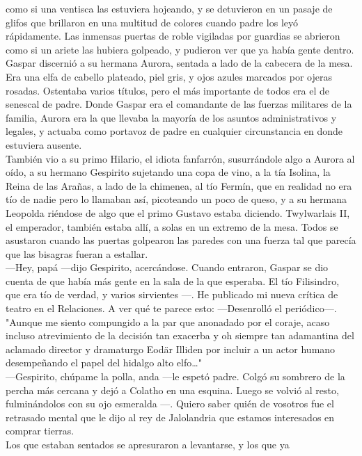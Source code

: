 \documentclass[
  letterpaper,
]{book}
\begin{document}
como si una ventisca las estuviera hojeando, y se detuvieron en un
pasaje de glifos que brillaron en una multitud de colores cuando padre
los leyó rápidamente. Las inmensas puertas de roble vigiladas por
guardias se abrieron como si un ariete las hubiera golpeado, y pudieron
ver que ya había gente dentro.\\
Gaspar discernió a su hermana Aurora, sentada a lado de la cabecera de
la mesa. Era una elfa de cabello plateado, piel gris, y ojos azules
marcados por ojeras rosadas. Ostentaba varios títulos, pero el más
importante de todos era el de senescal de padre. Donde Gaspar era el
comandante de las fuerzas militares de la familia, Aurora era la que
llevaba la mayoría de los asuntos administrativos y legales, y actuaba
como portavoz de padre en cualquier circunstancia en donde estuviera
ausente.\\
También vio a su primo Hilario, el idiota fanfarrón, susurrándole algo a
Aurora al oído, a su hermano Gespirito sujetando una copa de vino, a la
tía Isolina, la Reina de las Arañas, a lado de la chimenea, al tío
Fermín, que en realidad no era tío de nadie pero lo llamaban así,
picoteando un poco de queso, y a su hermana Leopolda riéndose de algo
que el primo Gustavo estaba diciendo. Twylwarlais II, el emperador,
también estaba allí, a solas en un extremo de la mesa. Todos se
asustaron cuando las puertas golpearon las paredes con una fuerza tal
que parecía que las bisagras fueran a estallar.\\
---Hey, papá ---dijo Gespirito, acercándose. Cuando entraron, Gaspar se
dio cuenta de que había más gente en la sala de la que esperaba. El tío
Filisindro, que era tío de verdad, y varios sirvientes ---. He publicado
mi nueva crítica de teatro en el Relaciones. A ver qué te parece esto:
---Desenrolló el periódico---. "Aunque me siento compungido a la par que
anonadado por el coraje, acaso incluso atrevimiento de la decisión tan
exacerba y oh siempre tan adamantina del aclamado director y dramaturgo
Eodär Illiden por incluir a un actor humano desempeñando el papel del
hidalgo alto elfo\ldots"\\
---Gespirito, chúpame la polla, anda ---le espetó padre. Colgó su
sombrero de la percha más cercana y dejó a Colatho en una esquina. Luego
se volvió al resto, fulminándolos con su ojo esmeralda ---. Quiero saber
quién de vosotros fue el retrasado mental que le dijo al rey de
Jalolandria que estamos interesados en comprar tierras.\\
Los que estaban sentados se apresuraron a levantarse, y los que ya
\end{document}
